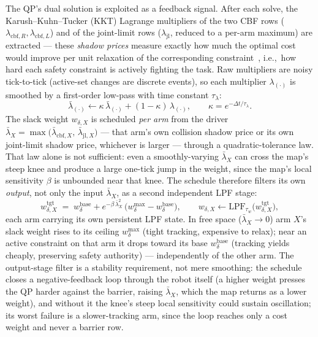 \documentclass[12pt,a4paper,twoside,openright]{report}
\begin{document}
The QP's dual solution is exploited as a feedback signal. After each solve, the Karush--Kuhn--Tucker (KKT) Lagrange multipliers of the two CBF rows ($\lambda_{\text{cbf},R},\lambda_{\text{cbf},L}$) and of the joint-limit rows ($\lambda_{\text{jl}}$, reduced to a per-arm maximum) are extracted --- these \emph{shadow prices} measure exactly how much the optimal cost would improve per unit relaxation of the corresponding constraint~\cite{boyd2004}, i.e.,\ how hard each safety constraint is actively fighting the task. Raw multipliers are noisy tick-to-tick (active-set changes are discrete events), so each multiplier $\lambda_{(\cdot)}$ is smoothed by a first-order low-pass with time constant $\tau_{\lambda}$:
\begin{equation}
\bar{\lambda}_{(\cdot)} \leftarrow \kappa\,\bar{\lambda}_{(\cdot)} + (1-\kappa)\,\lambda_{(\cdot)}, \qquad \kappa = e^{-\Delta t/\tau_{\lambda}}.
\end{equation}
The slack weight $w_{\delta,X}$ is scheduled \emph{per arm} from the driver $\bar{\lambda}_X = \max\bigl(\bar{\lambda}_{\text{cbf},X},\, \bar{\lambda}_{\text{jl},X}\bigr)$ --- that arm's own collision shadow price or its own joint-limit shadow price, whichever is larger --- through a quadratic-tolerance law. That law alone is not sufficient: even a smoothly-varying $\bar\lambda_X$ can cross the map's steep knee and produce a large one-tick jump in the weight, since the map's local sensitivity $\beta$ is unbounded near that knee. The schedule therefore filters its own \emph{output}, not only the input $\bar\lambda_X$, as a second independent LPF stage:
\begin{equation}
w_{\delta,X}^{\text{tgt}} \;=\; w_{\delta}^{\text{base}} + e^{-\beta\,\bar{\lambda}_X^2}\,\bigl(w_{\delta}^{\max} - w_{\delta}^{\text{base}}\bigr),
\qquad w_{\delta,X} \leftarrow \text{LPF}_{\tau_{w}}\bigl(w_{\delta,X}^{\text{tgt}}\bigr),
\label{eq:slacksched}
\end{equation}
each arm carrying its own persistent LPF state. In free space ($\bar{\lambda}_X\to 0$) arm $X$'s slack weight rises to its ceiling $w_{\delta}^{\max}$ (tight tracking, expensive to relax); near an active constraint on that arm it drops toward its base $w_{\delta}^{\text{base}}$ (tracking yields cheaply, preserving safety authority) --- independently of the other arm. The output-stage filter is a stability requirement, not mere smoothing: the schedule closes a negative-feedback loop through the robot itself (a higher weight presses the QP harder against the barrier, raising $\bar\lambda_X$, which the map returns as a lower weight), and without it the knee's steep local sensitivity could sustain oscillation; its worst failure is a slower-tracking arm, since the loop reaches only a cost weight and never a barrier row.
\end{document}
